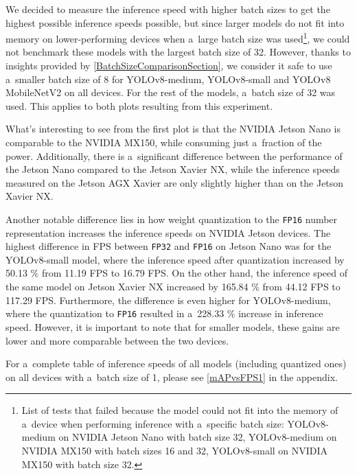 We decided to measure the inference speed with higher batch sizes to get the
highest possible inference speeds possible, but since larger models do not fit
into memory on
lower-performing devices when a~large batch size was
used\footnote{List of tests that failed because the model could not fit into
the memory of a~device when performing inference with a~specific batch size:
YOLOv8-medium on NVIDIA Jetson Nano with batch size 32, YOLOv8-medium on NVIDIA
MX150 with batch sizes 16 and 32, YOLOv8-small on NVIDIA MX150 with batch size
32.}, we could not benchmark these models with the largest batch size of 32.
However, thanks to insights provided by \autoref{BatchSizeComparisonSection}, we
consider it safe to use a~smaller batch size of 8 for YOLOv8-medium,
YOLOv8-small and YOLOv8 MobileNetV2 on all devices. For the rest of the models,
a~batch size of 32 was used. This applies to both plots resulting from this
experiment.

What's interesting to see from the first plot is that the NVIDIA Jetson Nano is
comparable to the NVIDIA MX150, while consuming just a~fraction of the power.
Additionally, there is a~significant difference between the performance of the
Jetson Nano compared to the Jetson Xavier NX, while the inference speeds measured
on the Jetson AGX Xavier are only slightly higher than on the Jetson Xavier NX.

Another notable difference lies in how weight quantization to the \texttt{FP16}
number representation increases the inference speeds on NVIDIA Jetson devices.
The highest difference in FPS between \texttt{FP32} and \texttt{FP16} on Jetson
Nano was for the YOLOv8-small model, where the inference speed after
quantization increased by \num{50.13} \% from \num{11.19} FPS to \num{16.79}
FPS. On the other hand, the inference speed of the same model on Jetson Xavier
NX increased by \num{165.84} \% from \num{44.12} FPS to \num{117.29} FPS.
Furthermore, the difference is even higher for YOLOv8-medium, where the
quantization to \texttt{FP16} resulted in a~\num{228.33} \% increase in
inference speed. However, it is important to note that for smaller models, these
gains are lower and more comparable between the two devices.

For a~complete table of inference speeds of all models (including quantized
ones) on all devices with a~batch size of 1, please see \autoref{mAPvsFPS1} in
the appendix.

